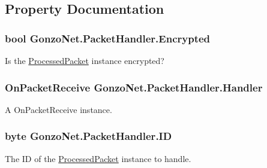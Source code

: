 \subsection{Property Documentation}
\hypertarget{class_gonzo_net_1_1_packet_handler_a874391e7467f18ccac385fdfe5e51f96}{
\subsubsection[{Encrypted}]{\setlength{\rightskip}{0pt plus 5cm}bool Gonzo\+Net.\+Packet\+Handler.\+Encrypted\hspace{0.3cm}{\ttfamily [get]}}}\label{class_gonzo_net_1_1_packet_handler_a874391e7467f18ccac385fdfe5e51f96}


Is the \hyperlink{class_gonzo_net_1_1_processed_packet}{Processed\+Packet} instance encrypted? 

\hypertarget{class_gonzo_net_1_1_packet_handler_a1209e12f51b42552b896e0483b6bc170}{
\subsubsection[{Handler}]{\setlength{\rightskip}{0pt plus 5cm}On\+Packet\+Receive Gonzo\+Net.\+Packet\+Handler.\+Handler\hspace{0.3cm}{\ttfamily [get]}}}\label{class_gonzo_net_1_1_packet_handler_a1209e12f51b42552b896e0483b6bc170}


A On\+Packet\+Receive instance. 

\hypertarget{class_gonzo_net_1_1_packet_handler_a6fc3d34bae9ece063fae2d857b10ddf1}{
\subsubsection[{I\+D}]{\setlength{\rightskip}{0pt plus 5cm}byte Gonzo\+Net.\+Packet\+Handler.\+I\+D\hspace{0.3cm}{\ttfamily [get]}}}\label{class_gonzo_net_1_1_packet_handler_a6fc3d34bae9ece063fae2d857b10ddf1}


The I\+D of the \hyperlink{class_gonzo_net_1_1_processed_packet}{Processed\+Packet} instance to handle. 

